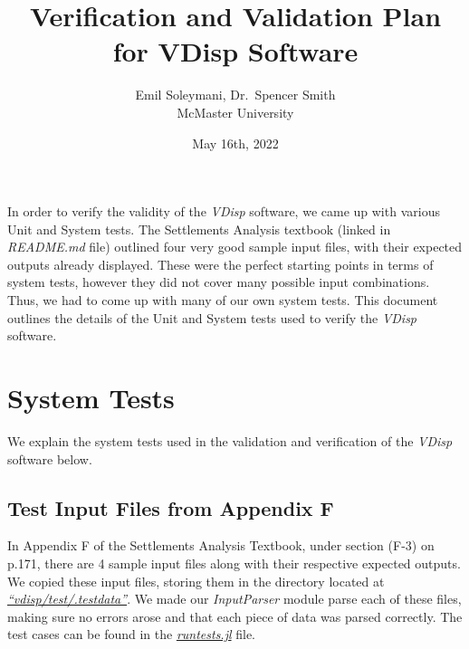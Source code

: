 \documentclass[11pt,fleqn]{article}
\newcommand{\indentpar}{\phantom{=}}
\begin{document}
      
      \title{Verification and Validation Plan for VDisp Software}
      \date{May 16th, 2022}
      \author{Emil Soleymani, Dr.~Spencer Smith\\ McMaster University}
      \maketitle

      \medskip

      \indentpar In order to verify the validity of the \emph{VDisp} software, we came
      up with various Unit and System tests. The Settlements Analysis textbook (linked in \emph{README.md} 
      file) outlined four very good sample input files, with their expected outputs 
      already displayed. These were the perfect starting points in terms of system tests, however 
      they did not cover many possible input combinations. Thus, we had to come up with many of 
      our own system tests. This document outlines the details of the Unit and System tests
      used to verify the \emph{VDisp} software.
      
    
    \pagebreak

    \section*{System Tests}
    \indentpar We explain the system tests used in the validation and verification
    of the \emph{VDisp} software below.
    \subsection*{Test Input Files from Appendix F}
    \indentpar In Appendix F of the Settlements Analysis Textbook, under section (F-3) 
    on p.171, there are 4 sample input files along with their respective expected outputs.
    We copied these input files, storing them in the directory located at 
    \href{https://github.com/smiths/vdisp/tree/main/test/.testdata}{\emph{“vdisp/test/.testdata”}}.
    We made our \emph{InputParser} module parse each of these files, making sure no errors arose and 
    that each piece of data was parsed correctly. The test cases can be found in the 
    \href{https://github.com/smiths/vdisp/tree/main/test/runtests.jl}{\emph{runtests.jl}} file.
\end{document}
